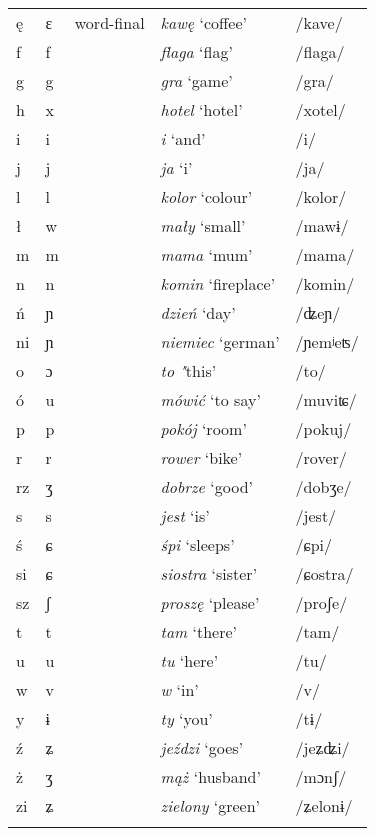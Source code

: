 {\begin{tabular}{lllll}
        ę & ɛ & word-final & \textit{kawę} `coffee' & /kave/\\
        f & f &  & \textit{flaga} `flag' & /flaga/\\
        g & g &  & \textit{gra} `game' & /gra/\\
        h & x &  & \textit{hotel} `hotel' & /xotel/\\
        i & i &  & \textit{i} `and' & /i/\\
        j & j &  & \textit{ja} `i' & /ja/\\
        l & l &  & \textit{kolor} `colour' & /kolor/\\
        ł & w &  & \textit{mały} `small' & /mawɨ/\\
        m & m &  & \textit{mama} `mum' & /mama/\\
        n & n &  & \textit{komin} `fireplace' & /komin/\\
        ń & ɲ &  & \textit{dzień} `day' & /ʥeɲ/\\
        ni & ɲ &  & \textit{niemiec} `german' & /ɲemʲeʦ/\\
        o & ɔ &  & \textit{to} \textit{"}this' & /to/\\
        ó & u &  & \textit{mówić} `to say' & /muviʨ/\\
        p & p &  & \textit{pokój} `room' & /pokuj/\\
        r & r &  & \textit{rower} `bike' & /rover/\\
        rz & ʒ &  & \textit{dobrze} `good' & /dobʒe/\\
        s & s &  & \textit{jest} `is' & /jest/\\
        ś & ɕ &  & \textit{śpi} `sleeps' & /ɕpi/\\
        si & ɕ &  & \textit{siostra} `sister' & /ɕostra/\\
        sz & ʃ &  & \textit{proszę} `please' & /proʃe/\\
        t & t &  & \textit{tam} `there' & /tam/\\
        u & u &  & \textit{tu} `here' & /tu/\\
        w & v &  & \textit{w} `in' & /v/\\
        y & ɨ &  & \textit{ty} `you' & /tɨ/\\
        ź & ʑ &  & \textit{jeździ} `goes' & /jeʑʥi/\\
        ż & ʒ &  & \textit{mąż} `husband' & /mɔnʃ/\\
        zi & ʑ &  & \textit{zielony} `green' & /ʑelonɨ/\\
        \lspbottomrule
    \end{tabular}
}
